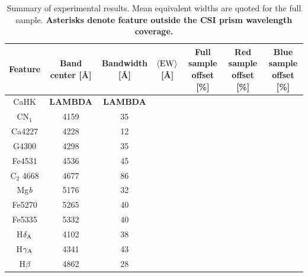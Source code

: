 \documentclass[a4paper,fleqn,usenatbib]{mnras}
\newcommand{\bfr}{\bf\color{red}}
\begin{document}

\begin{table}
	\centering
	\caption{Summary of experimental results. Mean equivalent widths are quoted for the full sample.
			{\bfr Asterisks denote feature outside the CSI prism wavelength coverage.}}
	\label{tbl:stats}
	\begin{tabular}{ccccccc} %
		\hline
	Feature & Band center [\AA] & Bandwidth [\AA] & $\langle{\rm EW}\rangle$ [\AA] & 
	Full sample offset [\%] & {\bfr Red} sample offset [\%] & {\bfr Blue} sample offset [\%]\\
		\hline
	CaHK & {\bfr LAMBDA} & {\bfr LAMBDA}\\
	CN$_{1}$    & 4159 & 35\\
	Ca4227 & 4228 & 12\\
	G4300  & 4298 & 35\\
	Fe4531 & 4536 & 45\\
	C$_{2}$ 4668 & 4677 & 86\\
	Mg{\it b}    & 5176 & 32\\
	Fe5270 & 5265 & 40\\
	Fe5335 & 5332 & 40\\
		\hline
	H$\delta_{\rm A}$    & 4102 & 38\\
	H$\gamma_{\rm A}$    & 4341 & 43\\
	H$\beta$     & 4862 & 28\\
		\hline
	\end{tabular}
\end{table}

\end{document}
